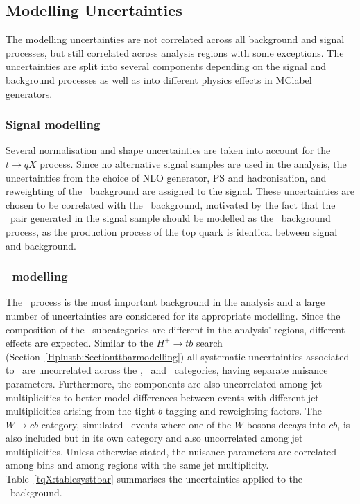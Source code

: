 \subsection{Modelling Uncertainties}
The modelling uncertainties are not correlated across all background and signal processes, but still correlated across analysis regions with some exceptions. The uncertainties are split into several components depending on the signal and background processes as well as into different physics effects in \acrshort{MClabel} generators. 

\subsubsection{Signal modelling}

Several normalisation and shape uncertainties are taken into account for the $t\to qX$ process. Since no alternative signal samples are used in the analysis, the uncertainties from the choice of NLO generator, PS and hadronisation, and reweighting of the \ttl\ background are assigned to the signal. These uncertainties are chosen to be correlated with the \ttl\ background, motivated by the fact that the \ttbar\ pair generated in the signal sample should be modelled as the \ttl\ background process, as the production process of the top quark is identical between signal and background. 

\subsubsection{\ttbar\ modelling}

The \ttbar\ process is the most important background in the analysis and a large number of uncertainties are considered for its appropriate modelling. Since the composition of the \ttbar\ subcategories are different in the analysis' regions, different effects are expected. Similar to the $H^+\to tb$ search (Section~\ref{Hplustb:Sectionttbarmodelling}) all systematic uncertainties associated to \ttbar\ are uncorrelated across the \ttb, \ttc\ and \ttl\ categories, having separate nuisance parameters. Furthermore, the components are also uncorrelated among jet multiplicities to better model differences between events with different jet multiplicities arising from the tight $b$-tagging and reweighting factors. The $W\to cb$ category, simulated \ttbar\ events where one of the $W$-bosons decays into $cb$, is also included but in its own category and also uncorrelated among jet multiplicities. Unless otherwise stated, the nuisance parameters are correlated among bins and among regions with the same jet multiplicity. Table~\ref{tqX:tablesysttbar} summarises the uncertainties applied to the \ttbar\ background. 

